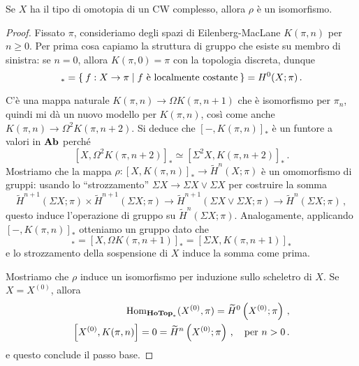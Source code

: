 	\begin{thm}\label{coh-rep}
		Se $X$ ha il tipo di omotopia di un CW complesso,
		allora $\rho$ è un isomorfismo.
		\begin{proof}
			Fissato $\pi$, consideriamo degli spazi di Eilenberg-MacLane
			$K(\pi,n)$ per $n \ge 0$. Per prima cosa capiamo
			la struttura di gruppo che esiste su membro di sinistra: %
			se $n=0$, allora $K(\pi,0)=\pi$ con la topologia discreta, dunque
			\begin{equation*}
				[X,K(\pi,0)]_{\ast} = \Set{f:X \to \pi | f \text{ è localmente costante} }
				= H^{0}(X;\pi)\,.
			\end{equation*}
			
			C'è una mappa naturale $K(\pi,n) \to \Omega K(\pi,n+1)$
			che è isomorfismo per $\pi_{n}$, quindi mi dà un nuovo modello per $K(\pi,n)$,
			così come anche $K(\pi,n) \to\Omega^{2} K(\pi, n+2)$.
			Si deduce che $[-,K(\pi,n)]_{\ast}$ è un funtore a valori in ${\normalfont\textbf{Ab}}$
			perché
			\begin{equation*}
				\left[X,\Omega^{2}K(\pi,n+2)\right]_{\ast} \simeq 
				\left[\Sigma^{2} X, K(\pi,n+2)\right]_{\ast}\,.
			\end{equation*}
			Mostriamo che la mappa $\rho: [X,K(\pi,n)]_{\ast} \to \widetilde{H}^{n}(X;\pi)$ 
			è un omomorfismo di gruppi: 
			usando lo ``strozzamento'' $\Sigma X \to \Sigma X \vee \Sigma X$
			per costruire la somma
		\begin{equation*}
			\widetilde{H}^{n+1}(\Sigma X;\pi) \times \widetilde{H}^{n+1}(\Sigma X;\pi)
			\longrightarrow \widetilde{H}^{n+1}(\Sigma X \vee \Sigma X;\pi)
			\longrightarrow \widetilde{H}^{n}(\Sigma X;\pi)\,,
		\end{equation*}
		questo induce l'operazione di gruppo su $\widetilde{H}^{n}(\Sigma X;\pi)$.
		Analogamente, applicando $[-,K(\pi,n)]_{\ast}$ otteniamo un gruppo dato che
		\begin{equation*}
			[X,K(\pi,n)]_{\ast} = [X,\Omega K(\pi,n+1)]_{\ast} = [\Sigma X,K(\pi,n+1)]_{\ast}
		\end{equation*}
		e lo strozzamento della sospensione di $X$ induce la somma come prima.
		
		Mostriamo che $\rho$ induce un isomorfismo per induzione sullo scheletro di $X$.
		Se $X=X^{(0)}$, allora
		\begin{align*}
			\operatorname{Hom}_{{\normalfont\textbf{HoTop}}_{\ast}}(X^{(0)},\pi) = \widetilde{H}^{0}\left(X^{(0)};\pi\right)\,, \\
			\left[ X^{(0)}, K(\pi,n) \right] = 0 
			= \widetilde{H}^{n}\left(X^{(0)};\pi\right)\,, \quad \text{per } n>0\,.
		\end{align*}
		e questo conclude il passo base. 
		

\end{proof}
\end{thm}
